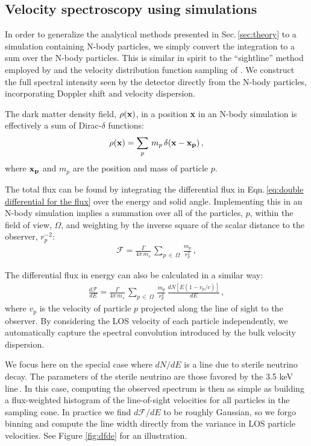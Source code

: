 \documentclass[aps,prd,10pt,twocolumn,superscriptaddress,showpacs]{revtex4-1}
\begin{document}
\subsection{Velocity spectroscopy using simulations}
\label{sec:simulations}

In order to generalize the analytical methods presented in Sec.\,\ref{sec:theory} to a simulation containing N-body particles, we simply convert the integration to a sum over the N-body particles.  This is similar in spirit to the ``sightline'' method employed by \cite{Lovell:2014lea} and the velocity distribution function sampling of \cite{Mao:2012hf}.  We construct the full spectral intensity seen by the detector directly from the N-body particles, incorporating Doppler shift and velocity dispersion.   

The dark matter density field, $\rho({\bf{x}})$, in a position {\bf x} in an N-body simulation is effectively a sum of Dirac-$\delta$ functions:
\begin{eqnarray}
\rho({\bf{x}}) = \sum_p\, m_p \, \delta({\bf{x}} - {\bf{x}_p}) \, ,
\end{eqnarray}
where $\bf{x}_p$ and $m_p$ are the position and mass of particle $p$. 

The total flux can be found by integrating the differential flux in Eqn.\,\ref{eq:double differential for the flux} over the energy and solid angle.  Implementing this in an N-body simulation implies a summation over all of the particles, $p$, within the field of view, $\Omega$, and weighting by the inverse square of the scalar distance to the observer, $r^{-2}_p$:
\begin{eqnarray} 
\mathcal{F} = \frac{\Gamma}{4\pi \, m_s} \, \sum_{p \, \in \, \Omega} \, \frac{m_p}{r_p^{2}} \, ,
\end{eqnarray}

The differential flux in energy can also be calculated in a similar way:
\begin{eqnarray}
\label{eq:discrete}
\frac{d\mathcal{F}}{dE} = \frac{\Gamma}{4 \pi \, m_s}\, \sum_{p \, \in \, \Omega} \, \frac{m_p}{r_p^{2}} \, \frac{dN[E(1-v_p/c)]}{dE} \, ,
\end{eqnarray}
where $v_p$ is the velocity of particle $p$ projected along the line of sight to the observer.  By
considering the LOS velocity of each particle independently, we automatically capture the spectral
convolution introduced by the bulk velocity dispersion. 

We focus here on the special case where $dN/dE$ is a line due to sterile neutrino decay.  The
parameters of the sterile neutrino are those favored by the 3.5 keV line\,\cite{Bulbul:2014sua}.  In
this case, computing the observed spectrum is then as simple as building a flux-weighted histogram
of the line-of-sight velocities for all particles in the sampling cone. In practice we find
$d\mathcal{F}/dE$ to be roughly Gaussian, so we forgo binning and compute the line width directly
from the variance in LOS particle velocities. See Figure \ref{fig:dfde} for an illustration. 
\end{document}
